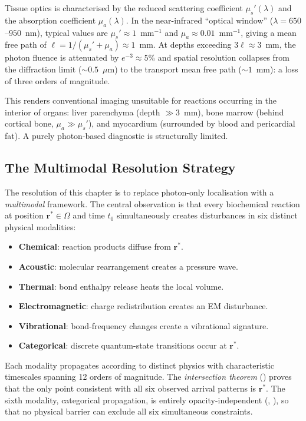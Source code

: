 Tissue optics is characterised by the reduced scattering coefficient
$\mu_s'(\lambda)$ and the absorption coefficient $\mu_a(\lambda)$.  In the
near-infrared ``optical window'' ($\lambda = 650$--$950$~nm), typical values
are $\mu_s' \approx 1$~mm$^{-1}$ and $\mu_a \approx 0.01$~mm$^{-1}$, giving
a mean free path of $\ell = 1/(\mu_s' + \mu_a) \approx 1$~mm.  At depths
exceeding $3\ell \approx 3$~mm, the photon fluence is attenuated by $e^{-3}
\approx 5\%$ and spatial resolution collapses from the diffraction limit
($\sim 0.5$~$\mu$m) to the transport mean free path ($\sim 1$~mm): a loss
of three orders of magnitude.

This renders conventional imaging unsuitable for reactions occurring in the
interior of organs: liver parenchyma (depth $\gg 3$~mm), bone marrow (behind
cortical bone, $\mu_a \gg \mu_s'$), and myocardium (surrounded by blood and
pericardial fat).  A purely photon-based diagnostic is structurally limited.

\subsection{The Multimodal Resolution Strategy}

The resolution of this chapter is to replace photon-only localisation with a
\emph{multimodal} framework.  The central observation is that every biochemical
reaction at position $\mathbf{r}^* \in \Omega$ and time $t_0$ simultaneously
creates disturbances in six distinct physical modalities:
\begin{itemize}[noitemsep]
    \item \textbf{Chemical}: reaction products diffuse from $\mathbf{r}^*$.
    \item \textbf{Acoustic}: molecular rearrangement creates a pressure wave.
    \item \textbf{Thermal}: bond enthalpy release heats the local volume.
    \item \textbf{Electromagnetic}: charge redistribution creates an
          EM disturbance.
    \item \textbf{Vibrational}: bond-frequency changes create a vibrational
          signature.
    \item \textbf{Categorical}: discrete quantum-state transitions occur
          at $\mathbf{r}^*$.
\end{itemize}

Each modality propagates according to distinct physics with characteristic
timescales spanning 12 orders of magnitude.  The \emph{intersection theorem}
() proves that the only point consistent with all six
observed arrival patterns is $\mathbf{r}^*$.  The sixth modality, categorical
propagation, is entirely opacity-independent (,
), so that no physical barrier can exclude all six
simultaneous constraints.


